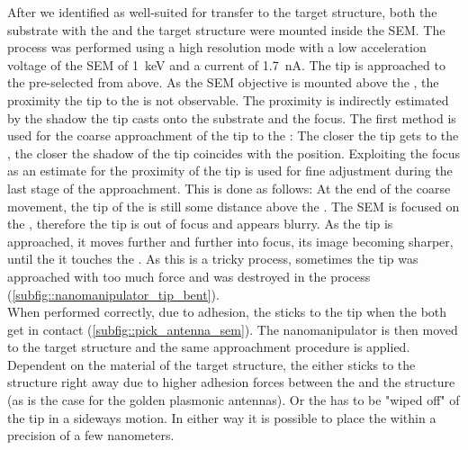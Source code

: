 	After we identified \nds as well-suited for transfer to the target structure, both the substrate with the \nds and the target structure were mounted inside the SEM.
	The process was performed using a high resolution mode with a low acceleration voltage of the SEM of \SI{1}{\kilo\electronvolt} and a current of \SI{1.7}{\nano\ampere}.
	The tip is approached to the pre-selected \nd from above.
	As the SEM objective is mounted above the \np, the proximity the \np tip  to the \nd is not observable.
	The proximity is indirectly estimated by the shadow the tip casts onto the substrate and the focus.
	The first method is used for the coarse approachment of the tip to the \nd: The closer the tip gets to the \nd, the closer the shadow of the tip coincides with the \nd position.
	Exploiting the focus as an estimate for the proximity of the tip is used for fine adjustment during the last stage of the approachment.
	This is done as follows:
	At the end of the coarse movement, the tip of the \np is still some distance above the \nd.
	The SEM is focused on the \nd, therefore the \np tip is out of focus and appears blurry.
	As the tip is approached, it moves further and further into focus, its image becoming sharper, until the it touches the \nd.
	As this is a tricky process, sometimes the tip was approached with too much force and was destroyed in the process (\cref{subfig::nanomanipulator_tip_bent}).
	\\
	When performed correctly, due to adhesion, the \nd sticks to the \np tip when the both get in contact (\cref{subfig::pick_antenna_sem}).
	The nanomanipulator is then moved to the target structure and the same approachment procedure is applied.
	Dependent on the material of the target structure, the \nd either sticks to the structure right away due to higher adhesion forces between the \nd and the structure (as is the case for the golden plasmonic antennas).
	Or the \nd has to be "wiped off" of the \np tip in a sideways motion.
	In either way it is possible to place the \nd within a precision of a few nanometers.
	\\
